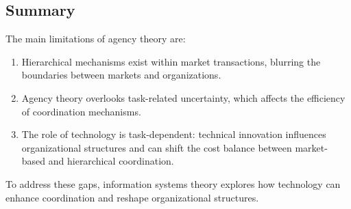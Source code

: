 \subsection{Summary}
The main limitations of agency theory are: 
\begin{enumerate}
    \item Hierarchical mechanisms exist within market transactions, blurring the boundaries between markets and organizations.
    \item Agency theory overlooks task-related uncertainty, which affects the efficiency of coordination mechanisms.
    \item The role of technology is task-dependent: technical innovation influences organizational structures and can shift the cost balance between market-based and hierarchical coordination.
\end{enumerate}
\noindent To address these gaps, information systems theory explores how technology can enhance coordination and reshape organizational structures.